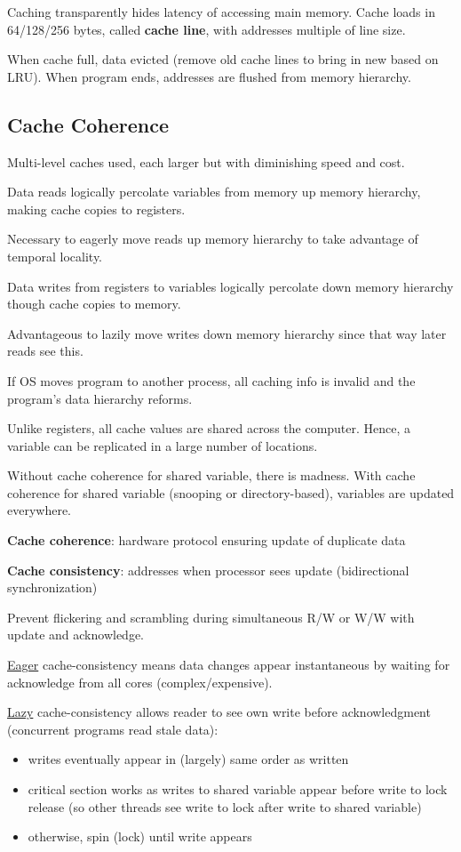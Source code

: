 \documentclass[11pt]{article}
\begin{document}
Caching transparently hides latency of accessing main memory.
Cache loads in 64/128/256 bytes, called \textbf{cache line}, with addresses multiple of line size.

When cache full, data evicted (remove old cache lines to bring in new based on LRU).
When program ends, addresses are flushed from memory hierarchy.
\subsection{Cache Coherence}
\label{sec:orgb3d3f58}
Multi-level caches used, each larger but with diminishing speed and cost.

Data reads logically percolate variables from memory up memory hierarchy, making cache copies to registers.

Necessary to eagerly move reads up memory hierarchy to take advantage of temporal locality.

Data writes from registers to variables logically percolate down memory hierarchy though
cache copies to memory.

Advantageous to lazily move writes down memory hierarchy since that way later reads see this.

If OS moves program to another process, all caching info is invalid and the program's data
hierarchy reforms.

Unlike registers, all cache values are shared across the computer.
Hence, a variable can be replicated in a large number of locations.

Without cache coherence for shared variable, there is madness.
With cache coherence for shared variable (snooping or directory-based), variables are updated
everywhere.

\textbf{Cache coherence}: hardware protocol ensuring update of duplicate data

\textbf{Cache consistency}: addresses when processor sees update (bidirectional synchronization)

Prevent flickering and scrambling during simultaneous R/W or W/W with update and acknowledge.

\uline{Eager} cache-consistency means data changes appear instantaneous by waiting for acknowledge from
all cores (complex/expensive).

\uline{Lazy} cache-consistency allows reader to see own write before acknowledgment (concurrent programs
read stale data):
\begin{itemize}
\item writes eventually appear in (largely) same order as written
\item critical section works as writes to shared variable appear before write to lock release (so
other threads see write to lock after write to shared variable)
\item otherwise, spin (lock) until write appears
\end{itemize}
\end{document}
